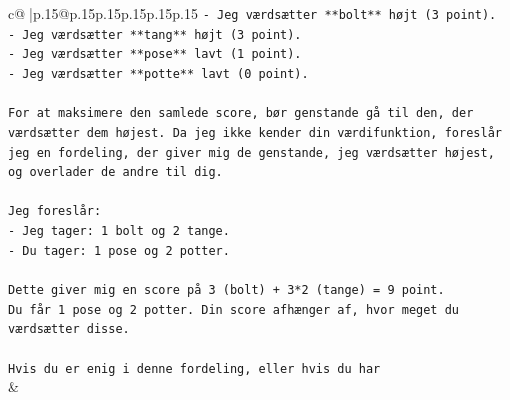\documentclass{article}
\begin{document}
{\begin{supertabular}{c@{$\;$}|p{.15\linewidth}@{}p{.15\linewidth}p{.15\linewidth}p{.15\linewidth}p{.15\linewidth}p{.15\linewidth}}
{{{\texttt{{-} Jeg værdsætter **bolt** højt (3 point).} \\
\texttt{{-} Jeg værdsætter **tang** højt (3 point).} \\
\texttt{{-} Jeg værdsætter **pose** lavt (1 point).} \\
\texttt{{-} Jeg værdsætter **potte** lavt (0 point).} \\
\\ 
\texttt{For at maksimere den samlede score, bør genstande gå til den, der værdsætter dem højest. Da jeg ikke kender din værdifunktion, foreslår jeg en fordeling, der giver mig de genstande, jeg værdsætter højest, og overlader de andre til dig.} \\
\\ 
\texttt{Jeg foreslår:} \\
\texttt{{-} Jeg tager: 1 bolt og 2 tange.} \\
\texttt{{-} Du tager: 1 pose og 2 potter.} \\
\\ 
\texttt{Dette giver mig en score på 3 (bolt) + 3*2 (tange) = 9 point.} \\
\texttt{Du får 1 pose og 2 potter. Din score afhænger af, hvor meget du værdsætter disse.} \\
\\ 
\texttt{Hvis du er enig i denne fordeling, eller hvis du har} \\
            }
        }
    }
    & \\ \\


\end{supertabular}}
\end{document}
